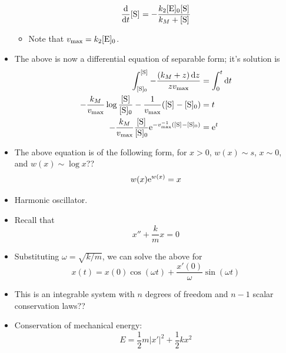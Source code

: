 \documentclass[../notes.tex]{subfiles}
\begin{document}
\begin{itemize}
    \begin{equation*}
        \dv{t}\cnc{S} = -\frac{k_2\cnc[0]{E}\cnc{S}}{k_M+\cnc{S}}
    \end{equation*}
    \begin{itemize}
        \item Note that $v_\text{max}=k_2\cnc[0]{E}$.
    \end{itemize}
    \item The above is now a differential equation of separable form; it's solution is
    \begin{align*}
        \int_{\cnc[0]{S}}^{\cnc{S}}-\frac{(k_M+z)\dd{z}}{zv_\text{max}} &= \int_0^t\dd{t}\\
        -\frac{k_M}{v_\text{max}}\log\frac{\cnc{S}}{\cnc[0]{S}}-\frac{1}{v_\text{max}}(\cnc{S}-\cnc[0]{S}) &= t\\
        -\frac{k_M}{v_\text{max}}\frac{\cnc{S}}{\cnc[0]{S}}\e[{-v_\text{max}^{-1}(\cnc{S}-\cnc[0]{S})}] &= \e[t]
    \end{align*}
    \item The above equation is of the following form, for $x>0$, $w(x)\sim s$, $x\sim 0$, and $w(x)\sim\log x$??
    \begin{equation*}
        w(x)\e[w(x)] = x
    \end{equation*}
    \item Harmonic oscillator.
    \item Recall that
    \begin{equation*}
        x''+\frac{k}{m}x = 0
    \end{equation*}
    \item Substituting $\omega=\sqrt{k/m}$, we can solve the above for
    \begin{equation*}
        x(t) = x(0)\cos(\omega t)+\frac{x'(0)}{\omega}\sin(\omega t)
    \end{equation*}
    \item This is an integrable system with $n$ degrees of freedom and $n-1$ scalar conservation laws??
    \item Conservation of mechanical energy:
    \begin{equation*}
        E = \frac{1}{2}m|x'|^2+\frac{1}{2}kx^2
    \end{equation*}
    \begin{figure}[h!]
        \centering
\end{figure}
\end{itemize}
\end{document}
